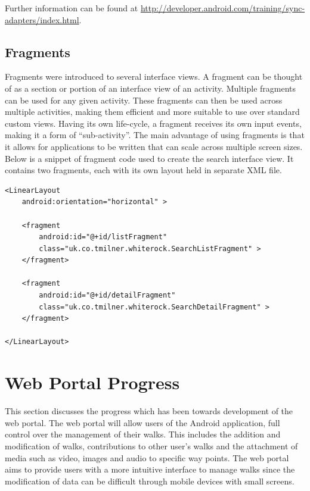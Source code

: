 \documentclass[11pt,a4paper]{article}
\begin{document}
Further information can be found at \url{http://developer.android.com/training/sync-adapters/index.html}.

\subsection{Fragments}
\label{sec:fragments}
Fragments were introduced to several interface views. A fragment can be thought of as a section or portion of an interface view of an activity. Multiple fragments can be used for any given activity. These fragments can then be used across multiple activities, making them efficient and more suitable to use over standard custom views. Having its own life-cycle, a fragment receives its own input events, making it a form of ``sub-activity''. The main advantage of using fragments is that it allows for applications to be written that can scale across multiple screen sizes. Below is a snippet of fragment code used to create the search interface view. It contains two fragments, each with its own layout held in separate XML file.

\begin{lstlisting}[captionpos=b, caption=Fragment Code Snippet, label=lst:Fragment Code Snippet, frame=single]
<LinearLayout
    android:orientation="horizontal" >

    <fragment
        android:id="@+id/listFragment"
        class="uk.co.tmilner.whiterock.SearchListFragment" >
    </fragment>

    <fragment
        android:id="@+id/detailFragment"
        class="uk.co.tmilner.whiterock.SearchDetailFragment" >
    </fragment>

</LinearLayout>
\end{lstlisting}

\section{Web Portal Progress}
\label{sec:web-portal}

This section discusses the progress which has been towards development of the web portal. The web portal will allow users of the Android application, full control over the management of their walks. This includes the addition and modification of walks, contributions to other user's walks and the attachment of media such as video, images and audio to specific way points. The web portal aims to provide users with a more intuitive interface to manage walks since the modification of data can be difficult through mobile devices with small screens.
\end{document}

